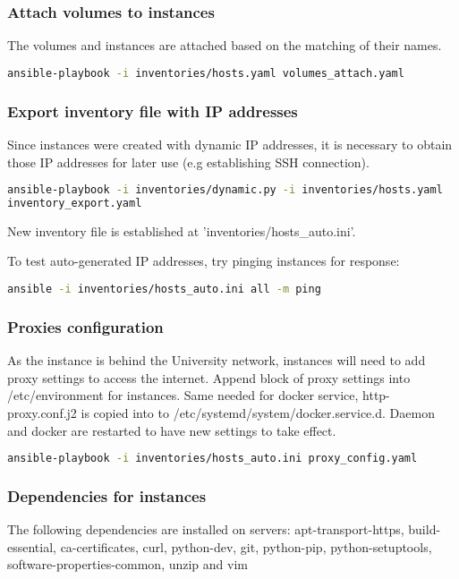 \subsubsection{Attach volumes to instances}
The volumes and instances are attached based on the matching of their names.  
\begin{lstlisting}[language=bash]
ansible-playbook -i inventories/hosts.yaml volumes_attach.yaml
\end{lstlisting}

\subsubsection{Export inventory file with IP addresses}
Since instances were created with dynamic IP addresses, it is necessary to obtain those IP addresses for later use
(e.g establishing SSH connection).  
\begin{lstlisting}[language=bash]
ansible-playbook -i inventories/dynamic.py -i inventories/hosts.yaml
inventory_export.yaml
\end{lstlisting}
New inventory file is established at 'inventories/hosts\_auto.ini'.  

To test auto-generated IP addresses, try pinging instances for response:  
\begin{lstlisting}[language=bash]
ansible -i inventories/hosts_auto.ini all -m ping
\end{lstlisting}

\subsubsection{Proxies configuration}
As the instance is behind the University network, instances will need to add proxy settings to access the internet. Append block of proxy settings into /etc/environment for instances. Same needed for docker service, http-proxy.conf.j2 is copied into to /etc/systemd/system/docker.service.d. Daemon and docker are restarted to have new settings to take effect.

\begin{lstlisting}[language=bash]
ansible-playbook -i inventories/hosts_auto.ini proxy_config.yaml 
\end{lstlisting}

\subsubsection{Dependencies for instances}
The following dependencies are installed on servers: 
apt-transport-https, build-essential, ca-certificates, curl, python-dev, git, python-pip, python-setuptools, software-properties-common, unzip and vim


